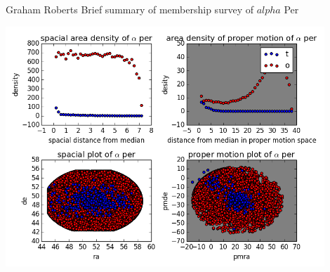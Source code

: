 \documentclass{article}
\begin{document}
Graham Roberts
Brief summary of membership survey of $alpha$ Per

\includegraphics[width=0.9\textwidth]{quadplot}
\end{document}
